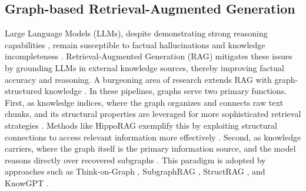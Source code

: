 \documentclass[11pt]{article}
\begin{document}
\subsection{Graph-based Retrieval-Augmented Generation}
Large Language Models (LLMs), despite demonstrating strong reasoning capabilities \citep{deepseek-ai_deepseek-r1_2025}, remain susceptible to factual hallucinations \citep{ji_survey_2023, huang_survey_2025} and knowledge incompleteness \citep{peng_study_2023}. Retrieval-Augmented Generation (RAG) \citep{lewis_retrieval-augmented_2021, gao_retrieval-augmented_2024} mitigates these issues by grounding LLMs in external knowledge sources, thereby improving factual accuracy and reasoning.
A burgeoning area of research extends RAG with graph-structured knowledge \citep{peng_graph_2024, xiang_when_2025, zhang_survey_2025, han_rag_2025}. In these pipelines, graphs serve two primary functions. First, as knowledge indices, where the graph organizes and connects raw text chunks, and its structural properties are leveraged for more sophisticated retrieval strategies \citep{liang_empowering_2024,liu_graphcoder_2024,zhang_multi-domain_2024,wang_knowledge_2023, li_graphreader_2024}. Methods like HippoRAG \citep{gutierrez_hipporag_2025, gutierrez_rag_2025} exemplify this by exploiting structural connections to access relevant information more effectively \citep{xiao_terag_2025}. Second, as knowledge carriers, where the graph itself is the primary information source, and the model reasons directly over recovered subgraphs \citep{shen_reason-align-respond_2025,liu_knowledge_2024}. This paradigm is adopted by approaches such as Think-on-Graph \citep{ma_think--graph_2025, sun_think--graph_2024}, SubgraphRAG \citep{li_simple_2025}, StructRAG \citep{li_structrag_2024}, and KnowGPT \citep{zhang_knowgpt_2024}.
\end{document}
